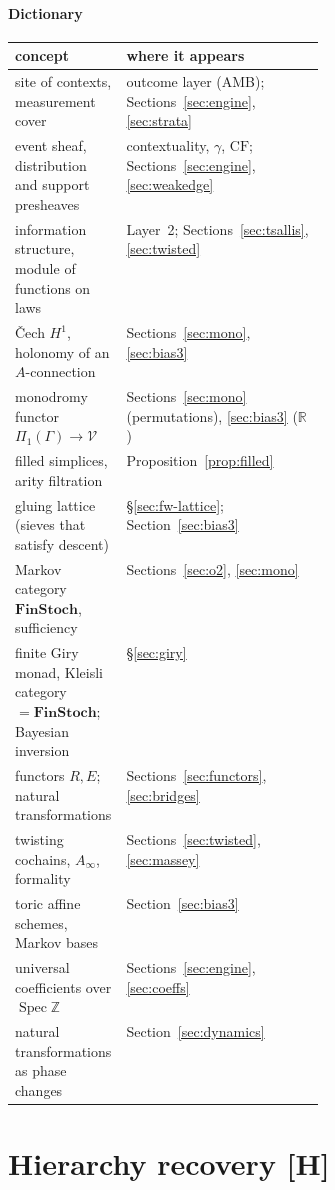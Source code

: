 \documentclass[11pt]{article}
\theoremstyle{definition}
\theoremstyle{remark}
\newcommand{\Z}{\mathbb{Z}}
\newcommand{\R}{\mathbb{R}}
\newcommand{\CF}{\mathrm{CF}}
\newcommand{\src}[1]{\textsf{\small[#1]}}
\begin{document}
\subsection{Dictionary}
\begin{center}\small
\begin{tabularx}{\linewidth}{@{}>{\raggedright}p{0.36\linewidth}>{\raggedright\arraybackslash}X@{}}
\toprule
concept & where it appears\\
\midrule
site of contexts, measurement cover & outcome layer (AMB); Sections~\ref{sec:engine}, \ref{sec:strata}\\
event sheaf, distribution and support presheaves & contextuality, $\gamma$, $\CF$; Sections~\ref{sec:engine}, \ref{sec:weakedge}\\
information structure, module of functions on laws & Layer~2; Sections~\ref{sec:tsallis}, \ref{sec:twisted}\\
\v{C}ech $H^1$, holonomy of an $A$-connection & Sections~\ref{sec:mono}, \ref{sec:bias3}\\
monodromy functor $\Pi_1(\Gamma)\to\mathcal V$ & Sections~\ref{sec:mono} (permutations), \ref{sec:bias3} ($\R$)\\
filled simplices, arity filtration & Proposition~\ref{prop:filled}\\
gluing lattice (sieves that satisfy descent) & \S\ref{sec:fw-lattice}; Section~\ref{sec:bias3}\\
Markov category $\mathbf{FinStoch}$, sufficiency & Sections~\ref{sec:o2}, \ref{sec:mono}\\
finite Giry monad, Kleisli category $=\mathbf{FinStoch}$; Bayesian inversion & \S\ref{sec:giry}\\
functors $R,E$; natural transformations & Sections~\ref{sec:functors}, \ref{sec:bridges}\\
twisting cochains, $A_\infty$, formality & Sections~\ref{sec:twisted}, \ref{sec:massey}\\
toric affine schemes, Markov bases & Section~\ref{sec:bias3}\\
universal coefficients over $\operatorname{Spec}\Z$ & Sections~\ref{sec:engine}, \ref{sec:coeffs}\\
natural transformations as phase changes & Section~\ref{sec:dynamics}\\
\bottomrule
\end{tabularx}
\end{center}

\part{Hierarchy recovery \src{H}}\label{part:hier}
\end{document}
